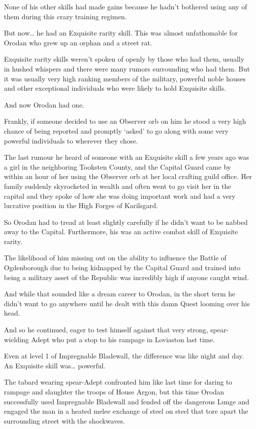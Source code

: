 \documentclass[a4paper,10pt]{book}
\begin{document}
None of his other skills had made gains because he hadn’t bothered using any of them during this crazy training regimen.\par
But now… he had an Exquisite rarity skill. This was almost unfathomable for Orodan who grew up an orphan and a street rat.\par
Exquisite rarity skills weren’t spoken of openly by those who had them, usually in hushed whispers and there were many rumors surrounding who had them. But it was usually very high ranking members of the military, powerful noble houses and other exceptional individuals who were likely to hold Exquisite skills.\par
And now Orodan had one.\par
Frankly, if someone decided to use an Observer orb on him he stood a very high chance of being reported and promptly ‘asked’ to go along with some very powerful individuals to wherever they chose.\par
The last rumour he heard of someone with an Exquisite skill a few years ago was a girl in the neighboring Tooksten County, and the Capital Guard came by within an hour of her using the Observer orb at her local crafting guild office. Her family suddenly skyrocketed in wealth and often went to go visit her in the capital and they spoke of how she was doing important work and had a very lucrative position in the High Forges of Karilsgard.\par
So Orodan had to tread at least slightly carefully if he didn’t want to be nabbed away to the Capital. Furthermore, his was an active combat skill of Exquisite rarity.\par
The likelihood of him missing out on the ability to influence the Battle of Ogdenborough due to being kidnapped by the Capital Guard and trained into being a military asset of the Republic was incredibly high if anyone caught wind.\par
And while that sounded like a dream career to Orodan, in the short term he didn’t want to go anywhere until he dealt with this damn Quest looming over his head.\par
And so he continued, eager to test himself against that very strong, spear-wielding Adept who put a stop to his rampage in Loviaston last time.\par
\par
Even at level 1 of Impregnable Bladewall, the difference was like night and day. An Exquisite skill was… powerful.\par
The tabard wearing spear-Adept confronted him like last time for daring to rampage and slaughter the troops of House Argon, but this time Orodan successfully used Impregnable Bladewall and fended off the dangerous Lunge and engaged the man in a heated melee exchange of steel on steel that tore apart the surrounding street with the shockwaves.\par
\end{document}
